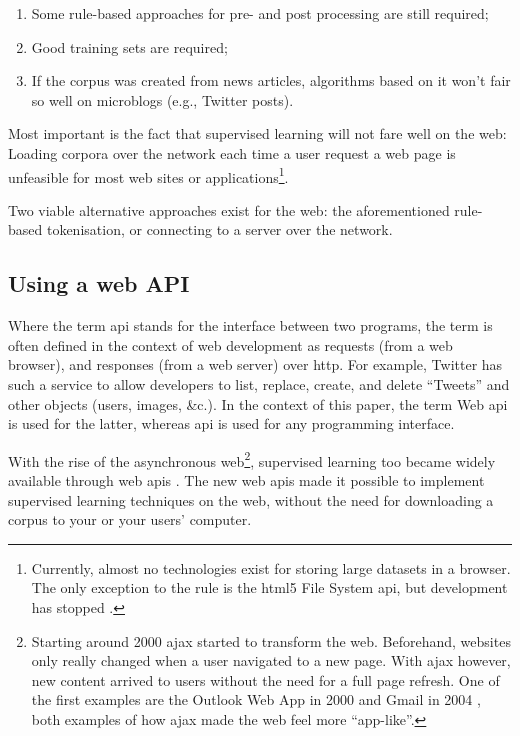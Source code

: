 \begin{enumerate}
\begin{enumerate}
\item
  Some rule-based approaches for pre- and post processing are still
  required;
\item
  Good training sets are required;
\item
  If the corpus was created from news articles, algorithms based on it
  won't fair so well on microblogs (e.g., Twitter posts).
\end{enumerate}

Most important is the fact that supervised learning will not fare well
on the web: Loading corpora over the network each time a user request a
web page is unfeasible for most web sites or applications\footnote{Currently,
  almost no technologies exist for storing large datasets in a browser.
  The only exception to the rule is the \acrshort{html5} File System
  \acrshort{api}, but development has stopped
  \autocite{w3.org-filesystem-dead}.}.

Two viable alternative approaches exist for the web: the aforementioned
rule-based tokenisation, or connecting to a server over the network.

\subsection{Using a web API}\label{using-a-web}

Where the term \gls{api} stands for the interface between two programs,
the term is often defined in the context of web development as requests
(from a web browser), and responses (from a web server) over \gls{http}.
For example, Twitter has such a service to allow developers to list,
replace, create, and delete ``Tweets'' and other objects (users, images,
\&c.). In the context of this paper, the term Web \gls{api} is used
for the latter, whereas \gls{api} is used for any programming interface.

With the rise of the asynchronous web\footnote{Starting around 2000
  \gls{ajax} started to transform the web. Beforehand, websites only
  really changed when a user navigated to a new page. With \gls{ajax}
  however, new content arrived to users without the need for a full page
  refresh. One of the first examples are the Outlook Web App in 2000
  \autocite{technet-outlook-web-access} and Gmail in 2004
  \autocite{gmailblog-gmail-ajax}, both examples of how \gls{ajax} made
  the web feel more ``app-like''.}, supervised learning too became
widely available through web \glspl{api}
\autocites[e.g.,][]{textteaser-web-api}{wordnet-web-api}{textrazor-web-api}.
The new web \glspl{api} made it possible to implement supervised
learning techniques on the web, without the need for downloading a
corpus to your or your users' computer.


\end{enumerate}
